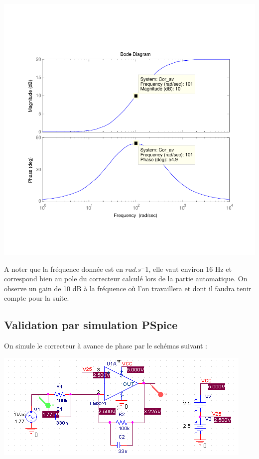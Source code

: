 \documentclass[11pt, french]{article} %
\begin{document}
\begin{center}
\includegraphics[scale = 0.8]{SolutionAnalogique/BodeAvPhase.pdf} 
\end{center}

A noter que la fréquence donnée est en $rad.s^-1$, elle vaut environ 16 Hz et correspond bien au pole du correcteur calculé lors de la partie automatique. On observe un gain de 10 dB à la fréquence où l'on travaillera et dont il faudra tenir compte pour la suite. 



\subsection{Validation par simulation PSpice}

On simule le correcteur à avance de phase par le schémas suivant : 

\begin{center}
\includegraphics[scale = 0.8]{SolutionAnalogique/orcad_sch.png} 
\end{center}
\end{document}
